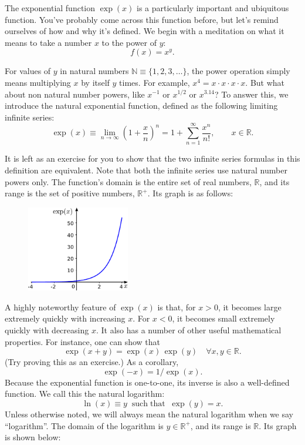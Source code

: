 \documentclass[10pt,a4paper]{article}
\begin{document}
The exponential function $\exp(x)$ is a particularly important and
ubiquitous function. You've probably come across this function before,
but let's remind ourselves of how and why it's defined. We begin with a
meditation on what it means to take a number $x$ to the power of
$y$:
\begin{equation}
  f(x) = x^y.
\end{equation}

For values of $y$ in natural numbers $\mathbb{N} \equiv
\{1,2,3,\dots\}$, the power operation simply means multiplying $x$ by
itself $y$ times. For example, $x^4 = x \cdot x \cdot x \cdot x$. But
what about non natural number powers, like $x^{-1}$ or $x^{1/2}$ or
$x^{3.14}$? To answer this, we introduce the natural exponential
function, defined as the following limiting infinite series:
\begin{equation}
  \exp(x) \equiv \lim_{n\rightarrow\infty} \left(1+\frac{x}{n}\right)^n = 1 + \sum_{n=1}^\infty\frac{x^n}{n!}, \qquad x \in \mathbb{R}.
\end{equation}

It is left as an exercise for you to show that the two infinite series
formulas in this definition are equivalent.  Note that both the
infinite series use natural number powers only. The function's domain
is the entire set of real numbers, $\mathbb{R}$, and its range is the
set of positive numbers, $\mathbb{R}^+$. Its graph is as follows:

\begin{figure}[h]
  \centering\includegraphics[width=0.4\textwidth]{exponential}
\end{figure}
    
A highly noteworthy feature of $\exp(x)$ is that, for $x > 0$, it
becomes large extremely quickly with increasing $x$. For $x < 0$, it
becomes small extremely quickly with decreasing $x$. It also has a
number of other useful mathematical properties. For instance, one can
show that
\begin{equation}
  \exp(x+y) = \exp(x)\,\exp(y) \quad \forall x, y \in \mathbb{R}.
\end{equation}
(Try proving this as an exercise.)  As a corollary,
\begin{equation}
  \exp(-x) = 1/\exp(x).
\end{equation}
Because the exponential function is one-to-one, its inverse is also a
well-defined function. We call this the natural logarithm:
\begin{equation}
\ln(x) \equiv y \;\; \mathrm{such}\;\mathrm{that}\;\;\exp(y) = x.
\end{equation}
Unless otherwise noted, we will always mean the natural logarithm when
we say ``logarithm''. The domain of the logarithm is $y \in
\mathbb{R}^+$, and its range is $\mathbb{R}$.  Its graph is shown
below:
\end{document}
